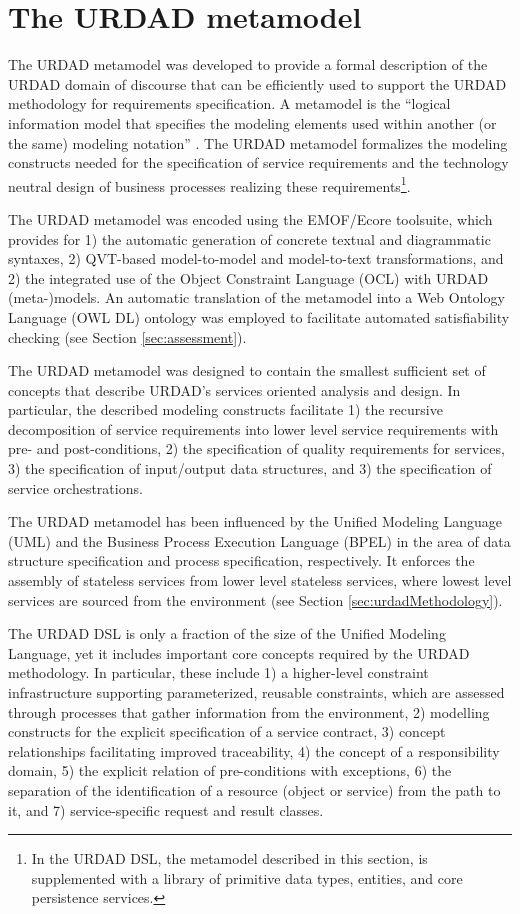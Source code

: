 \section{The URDAD metamodel \label{sec:metamodel}}

The URDAD metamodel was developed to provide a formal description of the URDAD domain of discourse that can be efficiently used to support the URDAD methodology for requirements specification. A metamodel is the ``logical information model that specifies the modeling elements used within another (or the same) modeling notation'' \cite{_ieee_2003}. The URDAD metamodel formalizes the modeling constructs needed for the specification of service requirements and the technology neutral design of business processes realizing these requirements\footnote{In the URDAD DSL, the metamodel described in this section, is supplemented with a library of primitive data types, entities, and core persistence services.}. 

The URDAD metamodel was encoded using the EMOF/Ecore \cite{} toolsuite, which provides for 1) the automatic generation of concrete textual and diagrammatic syntaxes, 2) QVT-based model-to-model and model-to-text transformations, and 2) the integrated use of the Object Constraint Language (OCL) \cite{_object_2010} with URDAD (meta-)models. An automatic translation of the metamodel into a Web Ontology Language (OWL DL) \cite{} ontology was employed to facilitate automated satisfiability checking (see Section \ref{sec:assessment}).

The URDAD metamodel was designed to contain the smallest sufficient set of concepts that describe URDAD's services oriented analysis and design. In particular, the described modeling constructs facilitate 1) the recursive decomposition of service requirements into lower level service requirements with pre- and post-conditions, 2) the specification of quality requirements for services, 3) the specification of input/output data structures, and 3) the specification of service orchestrations.

The URDAD metamodel has been influenced by the Unified Modeling Language (UML) and the Business Process Execution Language (BPEL) in the area of data structure specification and process specification, respectively. It enforces the assembly of stateless services from lower level stateless services, where lowest level services are sourced from the environment (see Section \ref{sec:urdadMethodology}). 

The URDAD DSL is only a fraction of the size of the Unified Modeling Language, yet it includes important core concepts required by the URDAD methodology. In particular, these include 1) a higher-level constraint infrastructure supporting parameterized, reusable constraints, which are assessed through processes that gather information from the environment, 2) modelling constructs for the explicit specification of a service contract, 3) concept relationships facilitating improved traceability, 4) the concept of a responsibility domain, 5) the explicit relation of pre-conditions with exceptions, 6) the separation of the identification of a resource (object or service) from the path to it, and 7) service-specific request and result classes.

